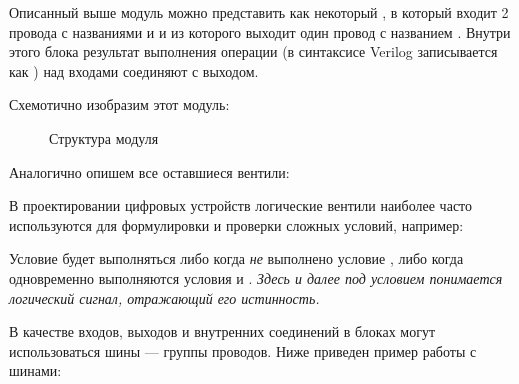 \noindent
\begin{minipage}{\linewidth}
 
\end{minipage}

\par{Описанный выше модуль можно представить как некоторый , в который входит 2 провода с названиями \emph{} и \emph{} и из которого выходит один провод с названием \emph{}. Внутри этого блока результат выполнения операции  (в синтаксисе Verilog записывается как \quotes{\&}) над входами соединяют с выходом.}
\par{Схемотично изобразим этот модуль:}

\begin{figure}[H]
  \centering
  \def\svgwidth{\columnwidth}
  
  \caption{Структура модуля }
\end{figure}

\par{Аналогично опишем все оставшиеся вентили:}

\noindent
\begin{minipage}{\linewidth}
  
\end{minipage}

\noindent
\begin{minipage}{\linewidth}
  
\end{minipage}

\noindent
\begin{minipage}{\linewidth}
  
\end{minipage}

\par{В проектировании цифровых устройств логические вентили наиболее часто используются для формулировки и проверки сложных условий, например:}



\par{Условие будет выполняться либо когда \emph{не} выполнено условие \emph{}, либо когда одновременно выполняются условия \emph{} и \emph{}. \emph{Здесь и далее под условием понимается логический сигнал, отражающий его истинность.}}
\par{В качестве входов, выходов и внутренних соединений в блоках могут использоваться шины — группы проводов. Ниже приведен пример работы с шинами:}

